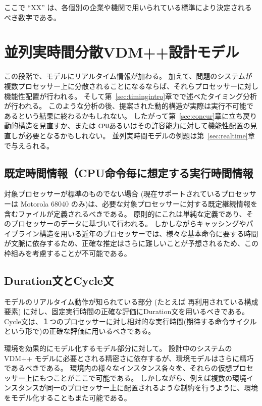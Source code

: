 \documentclass[\pformat,12pt]{jreport}
\begin{document}
ここで ``XX'' は、各個別の企業や機関で用いられている標準により決定されるべき数字である。

\section{並列実時間分散VDM++設計モデル}

この段階で、モデルにリアルタイム情報が加わる。
加えて、問題のシステムが複数プロセッサー上に分散されることになるならば、それらプロセッサーに対し機能性配置が行われる。
そして第~\ref{sec:timingintro}章でで述べたタイミング分析が行われる。
このような分析の後、提案された動的構造が実際は実行不可能であるという結果に終わるかもしれない。
したがって第~\ref{sec:concur}章に立ち戻り動的構造を見直すか、または \texttt{CPU}あるいはその許容能力に対して機能性配置の見直しが必要となるかもしれない。
並列実時間モデルの例題は第~\ref{sec:realtime}章で与えられる。

\subsection{既定時間情報（CPU命令毎に想定する実行時間情報}

対象プロセッサーが標準のものでない場合 (現在サポートされているプロセッサーは Motorola 68040 のみ)は、必要な対象プロセッサーに対する既定継続情報を含むファイルが定義されるべきである。 
原則的にこれは単純な定義であり、そのプロセッサーのデータに基づいて行われる。
しかしながらキャッシングやパイプライン構造を用いる近年のプロセッサーでは、様々な基本命令に要する時間が文脈に依存するため、正確な推定はさらに難しいことが予想されるため、この枠組みを考慮することが不可能である。

\subsection{Duration文とCycle文}

モデルのリアルタイム動作が知られている部分 (たとえば 再利用されている構成要素) に対し、固定実行時間の正確な評価にDuration文を用いるべきである。
Cycle文は、１つのプロセッサーに対し相対的な実行時間(期待する命令サイクルという形で)の正確な評価に用いるべきである。

環境を効果的にモデル化するモデル部分に対して。
設計中のシステムの VDM++ モデルに必要とされる精密さに依存するが、環境モデルはさらに精巧であるべきである。
環境内の様々なインスタンス各々を、それらの仮想プロセッサー上にもつことがここで可能である。
しかしながら、例えば複数の環境インスタンスが同一のプロセッサー上に配置されるような制約を行うように、環境をモデル化することもまた可能である。
\end{document}

